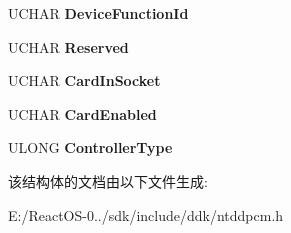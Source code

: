 \begin{DoxyCompactItemize}
\mbox{\label{struct___p_c_m_c_i_a___s_o_c_k_e_t___i_n_f_o_r_m_a_t_i_o_n_a63b426f004e846dd2d53498345753490}} 
U\+C\+H\+AR {\bfseries Device\+Function\+Id}
\item 
\mbox{\label{struct___p_c_m_c_i_a___s_o_c_k_e_t___i_n_f_o_r_m_a_t_i_o_n_a4d67c0e2f732af862d6d9040493e43a8}} 
U\+C\+H\+AR {\bfseries Reserved}
\item 
\mbox{\label{struct___p_c_m_c_i_a___s_o_c_k_e_t___i_n_f_o_r_m_a_t_i_o_n_a2615cee6a3bc57c65599507821446e4f}} 
U\+C\+H\+AR {\bfseries Card\+In\+Socket}
\item 
\mbox{\label{struct___p_c_m_c_i_a___s_o_c_k_e_t___i_n_f_o_r_m_a_t_i_o_n_aa79bd11b0e2f85296235d79bb8b5e13e}} 
U\+C\+H\+AR {\bfseries Card\+Enabled}
\item 
\mbox{\label{struct___p_c_m_c_i_a___s_o_c_k_e_t___i_n_f_o_r_m_a_t_i_o_n_aeaf7102a802c532073447b020f6ce647}} 
U\+L\+O\+NG {\bfseries Controller\+Type}
\end{DoxyCompactItemize}


该结构体的文档由以下文件生成\+:\begin{DoxyCompactItemize}
\item 
E\+:/\+React\+O\+S-\/0../sdk/include/ddk/ntddpcm.\+h\end{DoxyCompactItemize}
